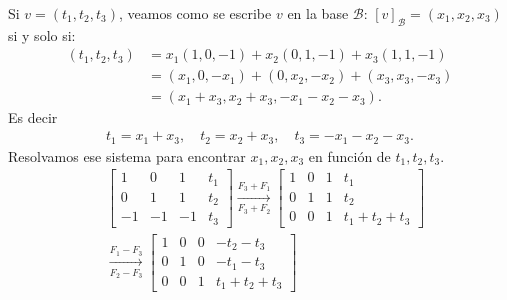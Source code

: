 \documentclass[handout]{beamer} %
\newcommand{\cB}{\mathcal{B}}
\begin{document}
    \begin{frame}
        Si $ v= (t_1, t_2, t_3)$, veamos como se escribe $v$ en la base $\cB$: $[v]_{\cB} = (x_1, x_2, x_3)$ si y solo si:
        \begin{align*}
            (t_1, t_2, t_3) &= x_1(1,0,-1) + x_2(0,1,-1) + x_3(1,1,-1)\\
            &= (x_1, 0,-x_1) + (0, x_2, -x_2) + (x_3, x_3, -x_3)\\
            &= (x_1+x_3, x_2+x_3, -x_1-x_2-x_3).
        \end{align*}
        Es decir 
        \begin{align*}
            t_1 = x_1+x_3, \quad t_2 = x_2+x_3, \quad t_3 = -x_1-x_2-x_3.
        \end{align*}
    Resolvamos ese sistema para encontrar $x_1, x_2, x_3$ en función de $t_1, t_2, t_3$.
    \begin{align*}
    &\left[\begin{array}{ccc|c}
        1&0&1&t_1\\
        0&1&1&t_2\\
        -1&-1&-1&t_3
    \end{array}\right]
    \underset{F_3+F_2}{\stackrel{F_3+F_1}{\longrightarrow}}
    \left[\begin{array}{ccc|c}
        1&0&1&t_1\\
        0&1&1&t_2\\
        0&0&1&t_1+t_2+t_3
    \end{array}\right] \\[10pt]
    &\underset{F_2-F_3}{\stackrel{F_1-F_3}{\longrightarrow}}
    \left[\begin{array}{ccc|c}
        1&0&0&-t_2-t_3\\
        0&1&0&-t_1-t_3\\
        0&0&1&t_1+t_2+t_3
    \end{array}\right]
    \end{align*}


    \end{frame}
\end{document}
